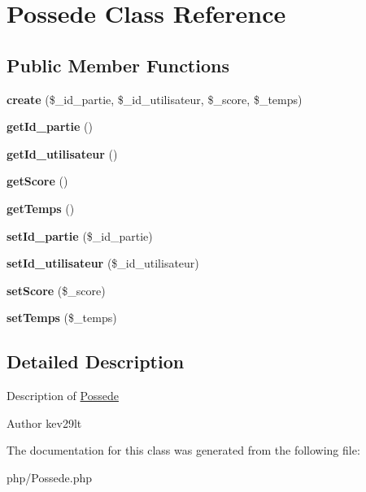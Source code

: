 \hypertarget{class_possede}{}\section{Possede Class Reference}
\label{class_possede}
\subsection*{Public Member Functions}
\begin{DoxyCompactItemize}
\item 
\mbox{\label{class_possede_a869aa857440e98e8c43a1d7badd67862}} 
{\bfseries create} (\$\+\_\+id\+\_\+partie, \$\+\_\+id\+\_\+utilisateur, \$\+\_\+score, \$\+\_\+temps)
\item 
\mbox{\label{class_possede_a3212f8c90b6adb064d0b70929dfeec4a}} 
{\bfseries get\+Id\+\_\+partie} ()
\item 
\mbox{\label{class_possede_ad991e108a803a4ffb390c232cc32bcdc}} 
{\bfseries get\+Id\+\_\+utilisateur} ()
\item 
\mbox{\label{class_possede_a19a6caf1c345ef59d5f8d7b9063c4c45}} 
{\bfseries get\+Score} ()
\item 
\mbox{\label{class_possede_ac4ecd9b75ee6930df752471c57ed58aa}} 
{\bfseries get\+Temps} ()
\item 
\mbox{\label{class_possede_a1c24bab5533c42a8a90d81053e39f92e}} 
{\bfseries set\+Id\+\_\+partie} (\$\+\_\+id\+\_\+partie)
\item 
\mbox{\label{class_possede_a8fb52ad68b9f922838477e56349edf2d}} 
{\bfseries set\+Id\+\_\+utilisateur} (\$\+\_\+id\+\_\+utilisateur)
\item 
\mbox{\label{class_possede_a989800be128d471abb7c4dbb184b8154}} 
{\bfseries set\+Score} (\$\+\_\+score)
\item 
\mbox{\label{class_possede_a36713bbe32fc4795bc155ee6aa370a00}} 
{\bfseries set\+Temps} (\$\+\_\+temps)
\end{DoxyCompactItemize}


\subsection{Detailed Description}
Description of \mbox{\hyperlink{class_possede}{Possede}}

\begin{DoxyAuthor}{Author}
kev29lt 
\end{DoxyAuthor}


The documentation for this class was generated from the following file\+:\begin{DoxyCompactItemize}
\item 
php/Possede.\+php\end{DoxyCompactItemize}
